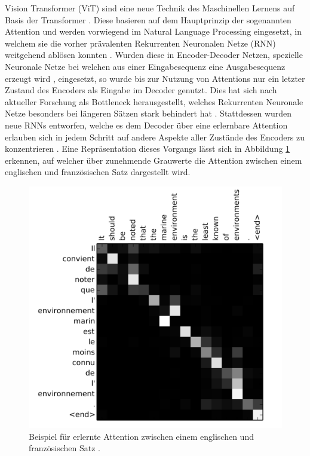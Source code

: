 \documentclass[twoside,a4paper]{IEEEtran}
\begin{document}
Vision Transformer (ViT) sind eine neue Technik des Maschinellen Lernens auf Basis der Transformer \cite{TRANSFORMERS}. Diese basieren auf dem Hauptprinzip der sogenannten Attention und werden vorwiegend im Natural Language Processing eingesetzt, in welchem sie die vorher prävalenten Rekurrenten Neuronalen Netze (RNN) weitgehend ablösen konnten \cite{TRANSFORMERS}. Wurden diese in Encoder-Decoder Netzen, spezielle Neuronale Netze bei welchen aus einer Eingabesequenz eine Ausgabesequenz erzeugt wird \cite[S.388-389]{MACHINE_LEARNING}, eingesetzt, so wurde bis zur Nutzung von Attentions nur ein letzter Zustand des Encoders als Eingabe im Decoder genutzt. Dies hat sich nach aktueller Forschung als Bottleneck herausgestellt, welches Rekurrenten Neuronale Netze besonders bei längeren Sätzen stark behindert hat \cite[S.2]{TRANSFORMERS}. Stattdessen wurden neue RNNs entworfen, welche es dem Decoder über eine erlernbare Attention erlauben sich in jedem Schritt auf andere Aspekte aller Zustände des Encoders zu konzentrieren \cite[S.4]{RNN_ATTENTION}. Eine Repräsentation dieses Vorgangs lässt sich in Abbildung \ref{bildAttention} erkennen, auf welcher über zunehmende Grauwerte die Attention zwischen einem englischen und französischen Satz dargestellt wird.

\begin{figure}[!htb]
	\includegraphics[width=\columnwidth]{attention_visualized}
	\caption{Beispiel für erlernte Attention zwischen einem englischen und französischen Satz \cite[S.6]{RNN_ATTENTION}.}
	\label{bildAttention}
\end{figure}
\end{document}
